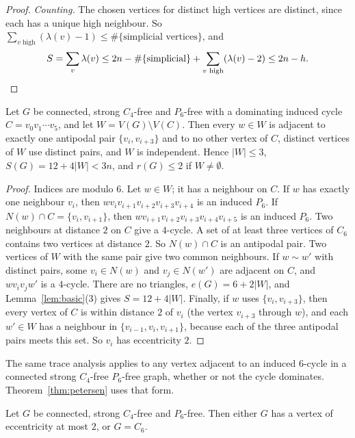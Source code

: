\documentclass[ASNA]{USG}
\theoremstyle{WBstyletwo}
\numberwithin{equation}{section}
\begin{document}
\begin{proof}
\emph{Counting.} The chosen vertices for distinct high vertices are distinct, since each has a unique high neighbour. So $\sum_{v\text{ high}}(\lambda(v)-1)\le\#\{\text{simplicial vertices}\}$, and
\[
S=\sum_v\lambda(v)\le 2n-\#\{\text{simplicial}\}+\sum_{v\text{ high}}(\lambda(v)-2)\le 2n-h.\qedhere
\]
\end{proof}

\begin{lemma}\label{lem:c6}
Let $G$ be connected, strong $C_4$-free and $P_6$-free with a dominating induced cycle $C=v_0v_1\cdots v_5$, and let $W=V(G)\setminus V(C)$. Then every $w\in W$ is adjacent to exactly one antipodal pair $\{v_i,v_{i+3}\}$ and to no other vertex of $C$, distinct vertices of $W$ use distinct pairs, and $W$ is independent. Hence $|W|\le 3$, $S(G)=12+4|W|<3n$, and $r(G)\le 2$ if $W\ne\emptyset$.
\end{lemma}

\begin{proof}
Indices are modulo $6$. Let $w\in W$; it has a neighbour on $C$. If $w$ has exactly one neighbour $v_i$, then $wv_iv_{i+1}v_{i+2}v_{i+3}v_{i+4}$ is an induced $P_6$. If $N(w)\cap C=\{v_i,v_{i+1}\}$, then $wv_{i+1}v_{i+2}v_{i+3}v_{i+4}v_{i+5}$ is an induced $P_6$. Two neighbours at distance $2$ on $C$ give a $4$-cycle. A set of at least three vertices of $C_6$ contains two vertices at distance $2$. So $N(w)\cap C$ is an antipodal pair. Two vertices of $W$ with the same pair give two common neighbours. If $w\sim w'$ with distinct pairs, some $v_i\in N(w)$ and $v_j\in N(w')$ are adjacent on $C$, and $wv_iv_jw'$ is a $4$-cycle. There are no triangles, $e(G)=6+2|W|$, and Lemma~\ref{lem:basic}(3) gives $S=12+4|W|$. Finally, if $w$ uses $\{v_i,v_{i+3}\}$, then every vertex of $C$ is within distance $2$ of $v_i$ (the vertex $v_{i+3}$ through $w$), and each $w'\in W$ has a neighbour in $\{v_{i-1},v_i,v_{i+1}\}$, because each of the three antipodal pairs meets this set. So $v_i$ has eccentricity $2$.
\end{proof}

The same trace analysis applies to any vertex adjacent to an induced $6$-cycle in a connected strong $C_4$-free $P_6$-free graph, whether or not the cycle dominates. Theorem~\ref{thm:petersen} uses that form.

\begin{lemma}\label{lem:ecc2}
Let $G$ be connected, strong $C_4$-free and $P_6$-free. Then either $G$ has a vertex of eccentricity at most $2$, or $G=C_6$.
\end{lemma}
\end{document}
